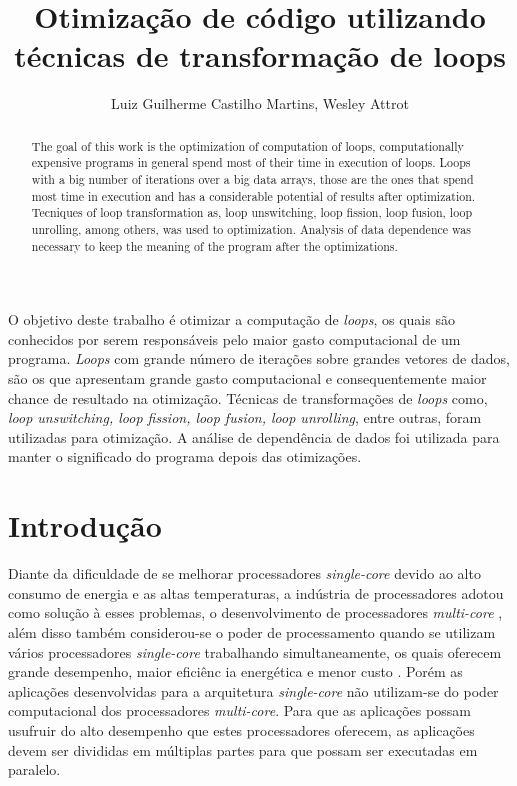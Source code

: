 \documentclass[12pt]{article}
\title{Otimização de código utilizando técnicas de transformação de loops}
\author{Luiz Guilherme Castilho Martins\inst{1}, Wesley Attrot\inst{1} }
\begin{document}
 
\maketitle
\begin{abstract}
        The goal of this work is the optimization of computation of loops,
        computationally expensive programs in general spend most of their time
        in execution of loops.
        Loops with a big number of iterations over a big data arrays, those are
        the ones that spend most time in execution and has a considerable
        potential of results after optimization.
        Tecniques of loop transformation as, loop unswitching, loop fission,
        loop fusion, loop unrolling, among others, was used to optimization.
        Analysis of data dependence was necessary to keep the meaning of the 
        program after the optimizations.
\end{abstract}

\begin{resumo} 
        O objetivo deste trabalho é otimizar a computação de \textit{loops}, os 
        quais são conhecidos por serem responsáveis pelo maior gasto 
        computacional de um programa. 
        \textit{Loops} com grande número de iterações sobre grandes vetores de 
        dados, são os que apresentam grande gasto computacional e 
        consequentemente maior chance de resultado na otimização.
        Técnicas de transformações de \textit{loops} como, \textit{loop 
        unswitching, loop fission, loop fusion, loop unrolling}, entre outras, 
        foram utilizadas para otimização.
        A análise de dependência de dados foi utilizada para manter o 
        significado do programa depois das otimizações.
\end{resumo}
\section{Introdução}

Diante da  dificuldade de se melhorar processadores \textit{single-core} devido 
ao alto consumo de energia e as altas
temperaturas, a indústria de processadores adotou como solução à esses problemas, 
o desenvolvimento de processadores \textit{multi-core} \cite{Suleman:2008}, 
além disso também considerou-se o poder de processamento quando se utilizam 
vários processadores \textit{single-core} 
trabalhando simultaneamente, os quais oferecem grande desempenho, maior 
eficiênc ia energética e menor custo \cite{realcloudWehner}.
Porém as aplicações desenvolvidas para a arquitetura \textit{single-core} não 
utilizam-se do poder computacional dos processadores \textit{multi-core}.
Para que as aplicações possam usufruir do alto desempenho que estes 
processadores oferecem, as aplicações devem ser 
divididas em múltiplas partes para que possam ser executadas em paralelo.
\end{document}
